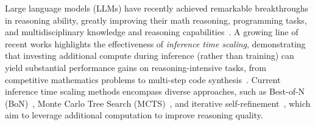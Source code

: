 \documentclass[11pt]{article}
\theoremstyle{definition}
\theoremstyle{remark}
\begin{document}
Large language models (LLMs) have recently achieved remarkable breakthroughs in reasoning ability, greatly improving their math reasoning,
programming tasks, and multidisciplinary knowledge and reasoning capabilities~\citep{chenprogram, chen2025towards, chen2024m3cot,zhou2023leasttomost, yue2024mmmu, wei2022chain}. A growing line of recent works highlights the effectiveness of \textit{inference time scaling}, demonstrating that investing additional compute during inference (rather than training) can yield substantial performance gains on reasoning-intensive tasks, from competitive mathematics problems to multi-step code synthesis~\citep{light2025sfs, light2025strategist, li2025a, wu2025inference, zhang2025aflow}. Current inference time scaling methods encompass diverse approaches, such as Best-of-N (BoN)~\citep{li-etal-2023-making}, Monte Carlo Tree Search (MCTS)~\citep{yao2023tree}, and iterative self-refinement~\citep{yao2023react}, which aim to leverage additional computation to improve reasoning quality.
\end{document}
